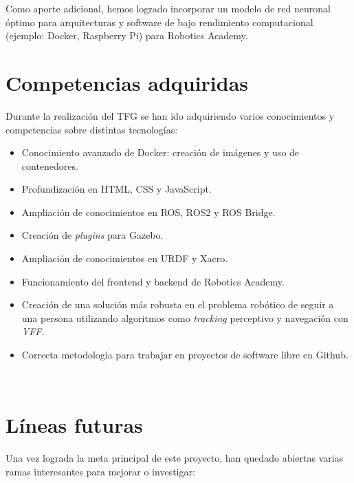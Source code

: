 Como aporte adicional, hemos logrado incorporar un modelo de red neuronal óptimo para arquitecturas y software de bajo rendimiento computacional (ejemplo: Docker, Raspberry Pi) para Robotics Academy.

\section{Competencias adquiridas}
\label{sec:competencias}

Durante la realización del TFG se han ido adquiriendo varios conocimientos y competencias sobre distintas tecnologías:

\begin{itemize}
	\item Conocimiento avanzado de Docker: creación de imágenes y uso de contenedores.
	\item Profundización en HTML, CSS y JavaScript.
	\item Ampliación de conocimientos en ROS, ROS2 y ROS Bridge.
	\item Creación de \textit{plugins} para Gazebo.
	\item Ampliación de conocimientos en URDF y Xacro.
	\item Funcionamiento del frontend y backend de Robotics Academy.
	\item Creación de una solución más robusta en el problema robótico de seguir a una persona utilizando algoritmos como \textit{tracking} perceptivo y navegación con \textit{VFF}.
	\item Correcta metodología para trabajar en proyectos de software libre en Github.
\end{itemize}\

\section{Líneas futuras}
\label{sec:lineas_futuras}

Una vez lograda la meta principal de este proyecto, han quedado abiertas varias ramas interesantes para mejorar o investigar:

